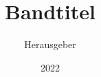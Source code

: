 \documentclass[ngerman,collection=true]{unigrazpub}
\title{Bandtitel}
\author{Herausgeber}
\date{2022}
\begin{document}


\tableofcontents


%
%

\appendix

\listofauthors
\end{document}
